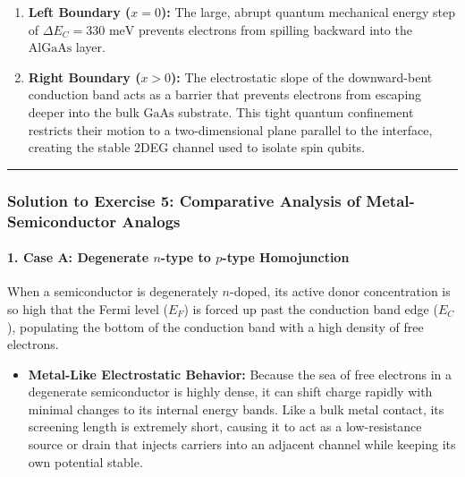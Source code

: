 \documentclass[
]{article}
\providecommand{\tightlist}{%
  \setlength{\itemsep}{0pt}\setlength{\parskip}{0pt}}
\begin{document}
\begin{enumerate}
\def\labelenumi{\arabic{enumi}.}
\tightlist
\item
  \textbf{Left Boundary (\(x = 0\)):} The large, abrupt quantum
  mechanical energy step of \(\Delta E_C = 330\text{ meV}\) prevents
  electrons from spilling backward into the \(\text{AlGaAs}\) layer.
\item
  \textbf{Right Boundary (\(x > 0\)):} The electrostatic slope of the
  downward-bent conduction band acts as a barrier that prevents
  electrons from escaping deeper into the bulk \(\text{GaAs}\)
  substrate. This tight quantum confinement restricts their motion to a
  two-dimensional plane parallel to the interface, creating the stable
  2DEG channel used to isolate spin qubits.
\end{enumerate}

\begin{center}\rule{0.5\linewidth}{0.5pt}\end{center}

\subsubsection{Solution to Exercise 5: Comparative Analysis of
Metal-Semiconductor
Analogs}\label{solution-to-exercise-5-comparative-analysis-of-metal-semiconductor-analogs}

\paragraph{\texorpdfstring{1. Case A: Degenerate \(n\)-type to
\(p\)-type
Homojunction}{1. Case A: Degenerate n-type to p-type Homojunction}}\label{case-a-degenerate-n-type-to-p-type-homojunction-1}

When a semiconductor is degenerately \(n\)-doped, its active donor
concentration is so high that the Fermi level (\(E_F\)) is forced up
past the conduction band edge (\(E_C\)), populating the bottom of the
conduction band with a high density of free electrons.

\begin{itemize}
\tightlist
\item
  \textbf{Metal-Like Electrostatic Behavior:} Because the sea of free
  electrons in a degenerate semiconductor is highly dense, it can shift
  charge rapidly with minimal changes to its internal energy bands. Like
  a bulk metal contact, its screening length is extremely short, causing
  it to act as a low-resistance source or drain that injects carriers
  into an adjacent channel while keeping its own potential stable.
\end{itemize}
\end{document}
